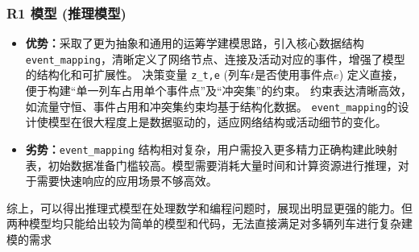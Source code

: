 \documentclass{article}
\begin{document}
    \subsubsection{R1 模型 (推理模型)}
    \begin{itemize}
        \item \textbf{优势：}采取了更为抽象和通用的运筹学建模思路，引入核心数据结构
        \texttt{event\_mapping}，清晰定义了网络节点、连接及活动对应的事件，增强了模型的结构化和可扩展性。
        决策变量 \texttt{z\_t,e} (列车\(t\)是否使用事件点\(e\))
        定义直接，便于构建“单一列车占用单个事件点”及“冲突集”的约束。
        约束表达清晰高效，如流量守恒、事件占用和冲突集约束均基于结构化数据。
        \texttt{event\_mapping}的设计使模型在很大程度上是数据驱动的，适应网络结构或活动细节的变化。
        \item \textbf{劣势：}\texttt{event\_mapping}
        结构相对复杂，用户需投入更多精力正确构建此映射表，初始数据准备门槛较高。模型需要消耗大量时间和计算资源进行推理，对于需要快速响应的应用场景不够高效。
    \end{itemize}

    综上，可以得出推理式模型在处理数学和编程问题时，展现出明显更强的能力。但两种模型均只能给出较为简单的模型和代码，无法直接满足对多辆列车进行复杂建模的需求
\end{document}
